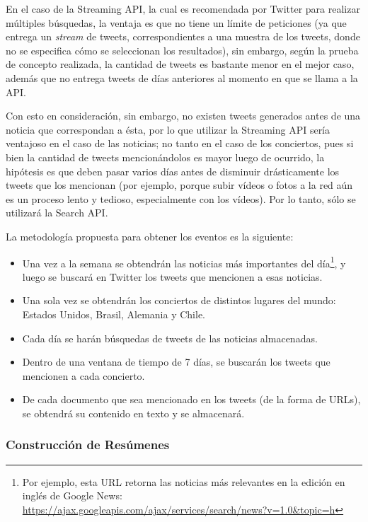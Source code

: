 \documentclass[11pt,letterpaper]{article}
\begin{document}
    En el caso de la Streaming API, la cual es recomendada por Twitter
    para realizar múltiples búsquedas, la ventaja es que no tiene un
    límite de peticiones (ya que entrega un \emph{stream} de tweets,
    correspondientes a una muestra de los tweets, donde no se
    especifica cómo se seleccionan los resultados), sin embargo,
    según la prueba de concepto realizada, la cantidad de tweets es
    bastante menor en el mejor caso, además que no entrega tweets de
    días anteriores al momento en que se llama a la API. 

    Con esto en consideración, sin embargo, no existen tweets
    generados antes de una noticia que correspondan a ésta, por lo que
    utilizar la Streaming API sería ventajoso en el caso de las
    noticias; no tanto en el caso de los conciertos, pues si bien la
    cantidad de tweets mencionándolos es mayor luego de ocurrido, la
    hipótesis es que deben pasar varios días antes de disminuir
    drásticamente los tweets que los mencionan (por ejemplo, porque
    subir vídeos o fotos a la red aún es un proceso lento y tedioso,
    especialmente con los vídeos). Por lo tanto, sólo se utilizará la
    Search API.

    La metodología propuesta para obtener los eventos es la siguiente:
\begin{itemize}
\item Una vez a la semana se obtendrán las noticias más importantes
      del día\footnote{Por ejemplo, esta URL retorna las noticias más
      relevantes en la edición en inglés de Google News:
      \href{https://ajax.googleapis.com/ajax/services/search/news?v=1.0&topic=h}{https://ajax.googleapis.com/ajax/services/search/news?v=1.0\&topic=h} },
      y luego se buscará en Twitter los tweets que mencionen a esas
      noticias.
\item Una sola vez se obtendrán los conciertos de distintos lugares
      del mundo: Estados Unidos, Brasil, Alemania y Chile.
\item Cada día se harán búsquedas de tweets de las noticias
      almacenadas.
\item Dentro de una ventana de tiempo de 7 días, se buscarán los
      tweets que mencionen a cada concierto.
\item De cada documento que sea mencionado en los tweets (de la forma
      de URLs), se obtendrá su contenido en texto y se almacenará.
\end{itemize}
\subsubsection{Construcción de Resúmenes}
\label{sec-5.1.2}
\end{document}
